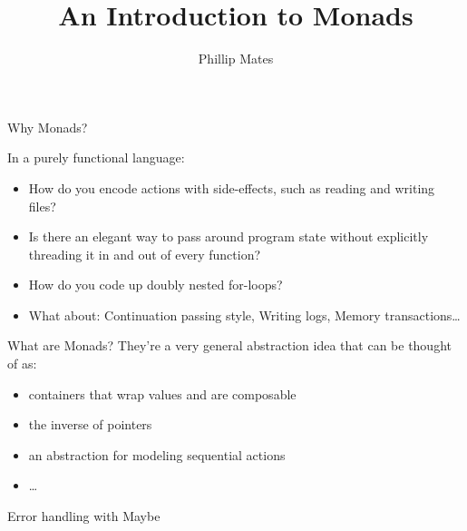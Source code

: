 \documentclass{beamer}
\title[Monads]{\Huge An Introduction to Monads}
\author{Phillip Mates}
\begin{document}
\begin{frame}
\titlepage
\end{frame}

\begin{frame}{Why Monads?}

 In a purely functional language:
  \begin{itemize}
    \item How do you encode actions with side-effects, such as reading and writing files?
    \item Is there an elegant way to pass around program state without explicitly threading it in and out of every function?
    \item How do you code up doubly nested for-loops?
    \item What about: Continuation passing style, Writing logs, Memory transactions\ldots
  \end{itemize}
\end{frame}

\begin{frame}{What are Monads?}
  They're a very general abstraction idea that can be thought of as:
  \vspace{.25in}
  \begin{itemize}
    \item containers that wrap values and are composable
    \item the inverse of pointers
    \item an abstraction for modeling sequential actions
    \item \ldots
  \end{itemize}
\end{frame}


\begin{frame}{Error handling with Maybe}
  \maybeType
\end{frame}

\end{document}
